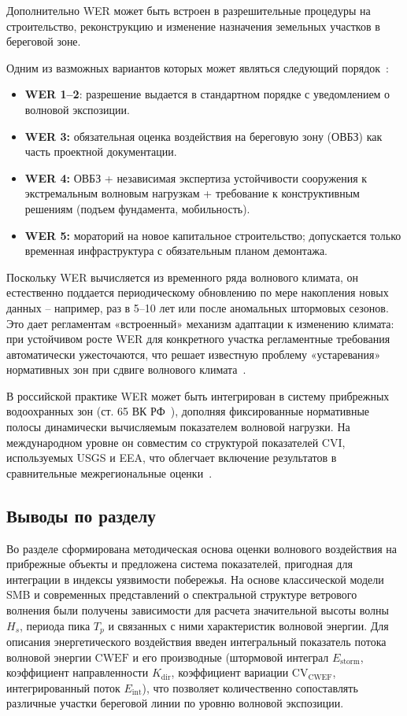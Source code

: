 Дополнительно WER может быть встроен в разрешительные процедуры на строительство, реконструкцию и изменение назначения земельных участков в береговой зоне. 

Одним из вазможных вариантов которых может являться следующий порядок~\cite{Pang2023CoastalErosionClimateChange}:
\begin{itemize}
    \item \textbf{WER 1–2}: разрешение выдается в стандартном порядке с уведомлением о волновой экспозиции.
    \item \textbf{WER 3:} обязательная оценка воздействия на береговую зону (ОВБЗ) как часть проектной документации.
    \item \textbf{WER 4:} ОВБЗ + независимая экспертиза устойчивости сооружения к экстремальным волновым нагрузкам + требование к конструктивным решениям (подъем фундамента, мобильность).
    \item \textbf{WER 5:} мораторий на новое капитальное строительство; допускается только временная инфраструктура с обязательным планом демонтажа.
\end{itemize}

Поскольку WER вычисляется из временного ряда волнового климата, он естественно поддается периодическому обновлению по мере накопления новых данных -- например, раз в 5–10 лет или после аномальных штормовых сезонов.
Это дает регламентам «встроенный» механизм адаптации к изменению климата: при устойчивом росте WER для конкретного участка регламентные требования автоматически ужесточаются, что решает известную проблему «устаревания» нормативных зон при сдвиге волнового климата~\cite{Ghanavati2023_wave_surge_coastlines}.

В российской практике WER может быть интегрирован в систему прибрежных водоохранных зон (ст. 65 ВК РФ~\cite{WaterCodeRF}), дополняя фиксированные нормативные полосы динамически вычисляемым показателем волновой нагрузки. На международном уровне он совместим со структурой показателей CVI, используемых USGS и EEA, что облегчает включение результатов в сравнительные межрегиональные оценки~\cite{Basnayake2026GlobalCVI, Guannel2022USVI_CVI}.

\subsection{Выводы по разделу}

Во разделе сформирована методическая основа оценки волнового воздействия на прибрежные объекты и предложена система показателей, пригодная для интеграции в индексы уязвимости побережья.
На основе классической модели SMB и современных представлений о спектральной структуре ветрового волнения были получены зависимости для расчета значительной высоты волны $H_s$, периода пика $T_p$ и связанных с ними характеристик волновой энергии.
Для описания энергетического воздействия введен интегральный показатель потока волновой энергии $\mathrm{CWEF}$ и его производные (штормовой интеграл $E_{\text{storm}}$, коэффициент направленности $K_{\text{dir}}$, коэффициент вариации $\mathrm{CV}_{\mathrm{CWEF}}$, интегрированный поток $E_{\text{int}}$), что позволяет количественно сопоставлять различные участки береговой линии по уровню волновой экспозиции.

